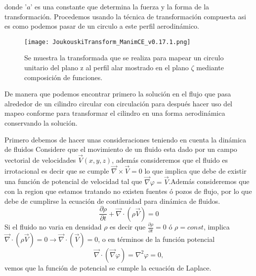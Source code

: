 \documentclass[12pt]{article}
\begin{document}
	\noindent donde '$a$' es una constante que determina la fuerza y la forma de la transformación. Procedemos usando la técnica de transformación compuesta asi es como podemos pasar de un circulo a este perfil aerodinámico.
	\begin{figure}[!h]
		\begin{small}
			\begin{center}
				\texttt{[image: JoukouskiTransform\_ManimCE\_v0.17.1.png]}
			\end{center}
			\caption{Se muestra la transformada que se realiza para mapear un circulo unitario del plano z al perfil alar mostrado en el plano $\zeta$ mediante composición de funciones. }
			\label{TransformacionCompuesta}
		\end{small}
	\end{figure}
	
	\noindent De manera que podemos encontrar primero la solución en el flujo que pasa alrededor de  un cilindro circular con circulación para después hacer uso del mapeo conforme para transformar el cilindro en una forma aerodinámica conservando la solución.	
	
	\noindent Primero debemos de hacer unas consideraciones teniendo en cuenta la dinámica de fluidos Considere que el movimiento de un fluido esta dado por un campo vectorial de velocidades $\vec{V}(x,y,z)$, además consideremos que el fluido es irrotacional es decir que se cumple $\vec{\nabla} \times \vec{V}=0 $ lo que implica que debe de existir una función de potencial de velocidad tal que $\vec{\nabla}\varphi = \vec{V}$.Además consideremos que con la region que estamos tratando no existen fuentes ó pozos de flujo, por lo que debe de cumplirse la ecuación de continuidad para dinámica de fluidos.
	\begin{equation*}
		\frac{\partial \rho}{\partial t} + \vec{\nabla} \cdotp (\rho \vec{V}) =0		
	\end{equation*}
	Si el fluido no varia en densidad $\rho$ es decir que $\frac{\partial \rho}{\partial t} =0 $ ó $\rho = const$, implica $\vec{\nabla} \cdotp (\rho \vec{V}) = 0 \longrightarrow \vec{\nabla} \cdotp (\vec{V}) =0 $, o en términos de la función potencial
	\begin{equation}
		\vec{\nabla} \cdotp (\vec{\nabla}\varphi) = \nabla^2 \varphi =0,
	\end{equation}	 
	vemos que la función de potencial se cumple la ecuación de Laplace.
	
\end{document}
